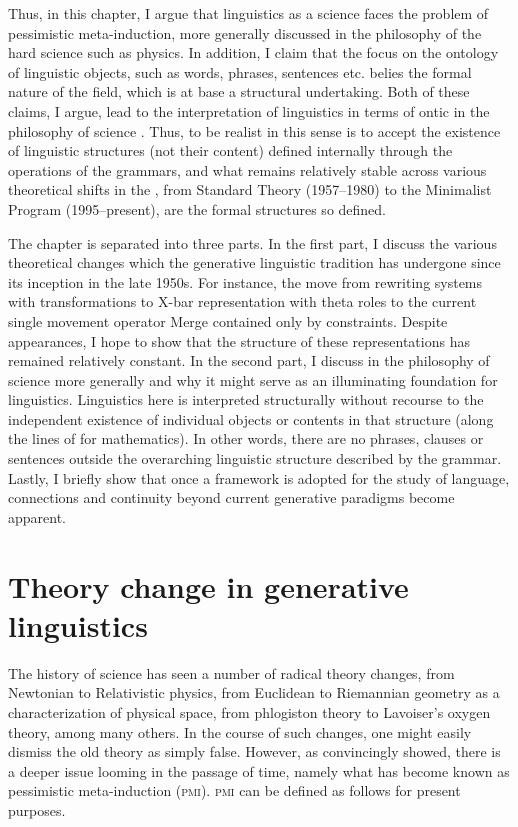 \documentclass[output=paper]{langscibook}
\begin{document}
Thus, in this chapter, I argue that linguistics as a science faces the problem of pessimistic meta-induction, more generally discussed in the philosophy of the hard science such as physics. In addition, I claim that the focus on the ontology of linguistic objects, such as words, phrases, sentences etc. belies the formal nature of the field, which is at base a structural undertaking. Both of these claims, I argue, lead to the interpretation of linguistics in terms of ontic  in the philosophy of science \citep{Ladyman1998, French2006}. Thus, to be realist in this sense is to accept the existence of linguistic structures (not their content) defined internally through the operations of the grammars, and what remains relatively stable across various theoretical shifts in the , from Standard Theory (1957--1980) to the Minimalist Program (1995--present), are the formal structures so defined. 

The chapter is separated into three parts. In the first part, I discuss the various theoretical changes which the generative linguistic tradition has undergone since its inception in the late 1950s. For instance, the move from rewriting systems with transformations to X-bar representation \citep{Chomsky1970} with theta roles to the current single movement operator Merge contained only by constraints. Despite appearances, I hope to show that the structure of these representations has remained relatively constant. In the second part, I discuss  in the philosophy of science more generally and why it might serve as an illuminating foundation for linguistics. Linguistics here is interpreted structurally without recourse to the independent existence of individual objects or contents in that structure (along the lines of \citealt{Shapiro1997} for mathematics). In other words, there are no phrases, clauses or sentences outside the overarching linguistic structure described by the grammar. Lastly, I briefly show that once a  framework is adopted for the study of language, connections and continuity beyond current generative paradigms become apparent.  

\section{Theory change in generative linguistics}
\label{sec:nefdt:theorychange}

The history of science has seen a number of radical theory changes, from Newtonian to Relativistic physics, from Euclidean to Riemannian geometry as a characterization of physical space, from phlogiston theory to Lavoiser's oxygen theory, among many others. In the course of such changes, one might easily dismiss the old theory as simply false. However, as \cite{Laudan1981} convincingly showed, there is a deeper issue looming in the passage of time, namely what has become known as pessimistic meta-induction (\textsc{pmi}). \textsc{pmi} can be defined as follows for present purposes. 
\end{document}
